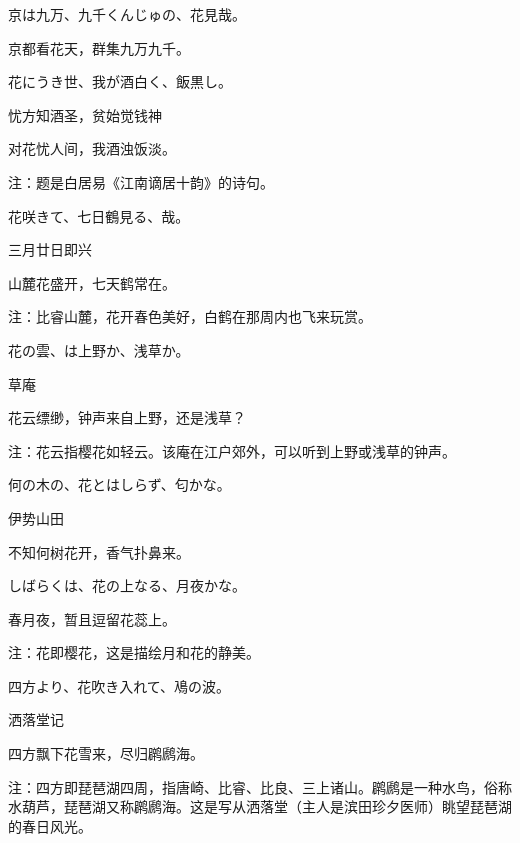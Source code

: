 \begin{haiku}
    {\FH 京は九万、九千くんじゅの、花見哉。}

    {\FK 京都看花天，群集九万九千。}
\end{haiku}

\begin{haiku}
    {\FH 花にうき世、我が酒白く、飯黒し。}

    {\FK 忧方知酒圣，贫始觉钱神}

    {\FK 对花忧人间，我酒浊饭淡。}

    {\FT 注：题是白居易《江南谪居十韵》的诗句。}
\end{haiku}

\begin{haiku}
    {\FH 花咲きて、七日鶴見る、哉。}

    {\FK 三月廿日即兴}

    {\FK 山麓花盛开，七天鹤常在。}

    {\FT 注：比睿山麓，花开春色美好，白鹤在那周内也飞来玩赏。}
\end{haiku}

\begin{haiku}
    {\FH 花の雲、は上野か、浅草か。}

    {\FK 草庵}

    {\FK 花云缥缈，钟声来自上野，还是浅草？}

    {\FT 注：花云指樱花如轻云。该庵在江户郊外，可以听到上野或浅草的钟声。}
\end{haiku}

\begin{haiku}
    {\FH 何の木の、花とはしらず、匂かな。}

    {\FK 伊势山田}

    {\FK 不知何树花开，香气扑鼻来。}
\end{haiku}

\begin{haiku}
    {\FH しばらくは、花の上なる、月夜かな。}

    {\FK 春月夜，暂且逗留花蕊上。}

    {\FT 注：花即樱花，这是描绘月和花的静美。}
\end{haiku}

\begin{haiku}
    {\FH 四方より、花吹き入れて、鳰の波。}

    {\FK 洒落堂记}

    {\FK 四方飘下花雪来，尽归䴙䴘海。}

    {\FT 注：四方即琵琶湖四周，指唐崎、比睿、比良、三上诸山。䴙䴘是一种水鸟，俗称水葫芦，琵琶湖又称䴙䴘海。这是写从洒落堂（主人是滨田珍夕医师）眺望琵琶湖的春日风光。}
\end{haiku}

